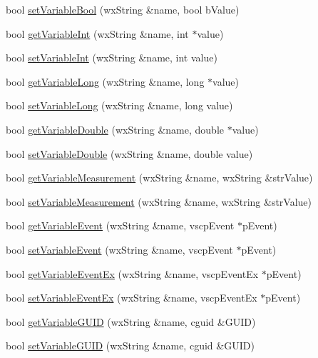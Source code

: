 \begin{DoxyCompactItemize}
\item 
bool \hyperlink{class_c_canal_super_wrapper_a1649d2946ad99bfe9853da88a662ed3e}{setVariableBool} (wxString \&name, bool bValue)
\item 
bool \hyperlink{class_c_canal_super_wrapper_a0276413297a2fcf5615a7bf83da28a51}{getVariableInt} (wxString \&name, int $\ast$value)
\item 
bool \hyperlink{class_c_canal_super_wrapper_a58d037aed6012c23e1aa2c69b359b268}{setVariableInt} (wxString \&name, int value)
\item 
bool \hyperlink{class_c_canal_super_wrapper_ab1c15254e579066ca4f5004597a097fc}{getVariableLong} (wxString \&name, long $\ast$value)
\item 
bool \hyperlink{class_c_canal_super_wrapper_a0940b618effec6c702d7218360f13837}{setVariableLong} (wxString \&name, long value)
\item 
bool \hyperlink{class_c_canal_super_wrapper_a0fa37c7b941ecaad227177841a24300e}{getVariableDouble} (wxString \&name, double $\ast$value)
\item 
bool \hyperlink{class_c_canal_super_wrapper_a288de864c2ac98c811cf0a212b151c85}{setVariableDouble} (wxString \&name, double value)
\item 
bool \hyperlink{class_c_canal_super_wrapper_ad0c4803857de3a2d259a96ebe6317192}{getVariableMeasurement} (wxString \&name, wxString \&strValue)
\item 
bool \hyperlink{class_c_canal_super_wrapper_a0341db7880611ddc8c4194fa3460fbb9}{setVariableMeasurement} (wxString \&name, wxString \&strValue)
\item 
bool \hyperlink{class_c_canal_super_wrapper_a0dc4e23ff4782e9e6ae152119c6baf24}{getVariableEvent} (wxString \&name, vscpEvent $\ast$pEvent)
\item 
bool \hyperlink{class_c_canal_super_wrapper_af534e277da408ae2bd482c6c2614ff3f}{setVariableEvent} (wxString \&name, vscpEvent $\ast$pEvent)
\item 
bool \hyperlink{class_c_canal_super_wrapper_ad8f799c4767da6c56009d14ac3dad75b}{getVariableEventEx} (wxString \&name, vscpEventEx $\ast$pEvent)
\item 
bool \hyperlink{class_c_canal_super_wrapper_a3010d9a88088f08ba69b8cdae8b1f108}{setVariableEventEx} (wxString \&name, vscpEventEx $\ast$pEvent)
\item 
bool \hyperlink{class_c_canal_super_wrapper_a4522bd480acea25177d4038d4e95a9e8}{getVariableGUID} (wxString \&name, cguid \&GUID)
\item 
bool \hyperlink{class_c_canal_super_wrapper_ab5863946dbd7318df658a2cc7740776f}{setVariableGUID} (wxString \&name, cguid \&GUID)

\end{DoxyCompactItemize}
